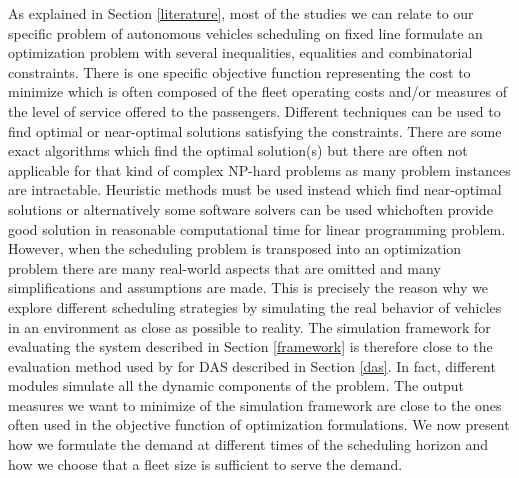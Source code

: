 \documentclass[12pt,a4paper]{article}
\begin{document}
As explained in Section \ref{literature}, most of the studies we can relate to our specific problem of autonomous vehicles scheduling on fixed line formulate an optimization problem with several inequalities, equalities and combinatorial constraints. There is one specific objective function representing the cost to minimize which is often composed of the fleet operating costs and/or measures of the level of service offered to the passengers. Different techniques can be used to find optimal or near-optimal solutions satisfying the constraints. There are some exact algorithms which find the optimal solution(s) but there are often not applicable for that kind of complex NP-hard problems as many problem instances are intractable. Heuristic methods  must be used instead which find near-optimal solutions or alternatively some software solvers can be used whichoften provide good solution in reasonable computational time for linear programming problem. However, when the scheduling problem is transposed into an optimization problem there are many real-world aspects that are omitted and many simplifications and assumptions are made. This is precisely the reason why we explore different scheduling strategies by simulating the real behavior of vehicles in an environment as close as possible to reality. The simulation framework for evaluating the system described in Section \ref{framework} is therefore close to the evaluation method used by \cite{evaluation} for DAS described in Section \ref{das}. In fact, different modules simulate all the dynamic components of the problem. The output measures we want to minimize of the simulation framework are close to the ones often used in the objective function of optimization formulations. We now present how we formulate the demand at different times of the scheduling horizon and how we choose that a fleet size is sufficient to serve the demand.
\end{document}
